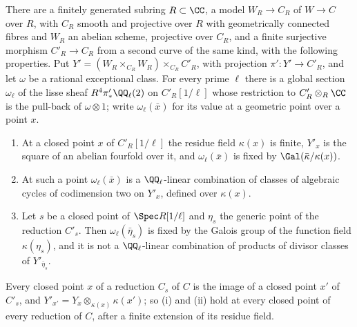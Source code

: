 \begin{proposition}
\label{prop:modp}
There are a finitely generated subring $R\subset\CC$, a model $W_{R}\to
C_{R}$ of $W\to C$ over $R$, with $C_{R}$ smooth and projective over $R$ with
geometrically connected fibres and $W_{R}$ an abelian scheme, projective over
$C_{R}$, and a finite surjective morphism $C'_{R}\to C_{R}$ from a second curve of the same
kind, with the following properties. Put $Y'=(W_{R}\times_{C_{R}}W_{R})
\times_{C_{R}}C'_{R}$, with projection $\pi'\colon Y'\to C'_{R}$, and let
$\omega$ be a rational exceptional class. For every prime $\ell$ there is a
global section $\omega_{\ell}$ of the lisse sheaf
$R^{4}\pi'_{*}\QQ_{\ell}(2)$ on $C'_{R}[1/\ell]$ whose restriction to
$C'_{R}\otimes_{R}\CC$ is the pull-back of $\omega\otimes1$; write
$\omega_{\ell}(\bar{x})$ for its value at a geometric point over a point $x$.
\begin{enumerate}[label=\textup{(\roman*)},leftmargin=2.6em,itemsep=2pt]
\item At a closed point $x$ of $C'_{R}[1/\ell]$ the residue field
  $\kappa(x)$ is finite, $Y'_{x}$ is the square of an abelian fourfold over
  it, and $\omega_{\ell}(\bar{x})$ is fixed by $\Gal(\bar{\kappa}/\kappa(x))$.
\item At such a point $\omega_{\ell}(\bar{x})$ is a $\QQ_{\ell}$-linear
  combination of classes of algebraic cycles of codimension two on $Y'_{x}$,
  defined over $\kappa(x)$.
\item Let $s$ be a closed point of $\Spec R[1/\ell]$ and $\eta_{s}$ the generic
  point of the reduction $C'_{s}$. Then $\omega_{\ell}(\bar\eta_{s})$ is fixed
  by the Galois group of the function field $\kappa(\eta_{s})$, and it is not
  a $\QQ_{\ell}$-linear combination of products of divisor classes of
  $Y'_{\bar\eta_{s}}$.
\end{enumerate}
Every closed point $x$ of a reduction $C_{s}$ of $C$ is the image of a closed
point $x'$ of $C'_{s}$, and $Y'_{x'}=Y_{x}\otimes_{\kappa(x)}\kappa(x')$; so
(i) and (ii) hold at every closed point of every reduction of $C$, after a
finite extension of its residue field.
\end{proposition}


